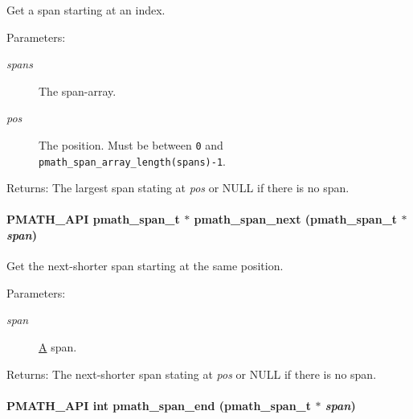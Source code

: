 Get a span starting at an index. 

\begin{Desc}
\item[Parameters:]
\begin{description}
\item[{\em spans}]The span-array. \item[{\em pos}]The position. Must be between {\tt 0} and {\tt pmath\_\-span\_\-array\_\-length(spans)-1}. \end{description}
\end{Desc}
\begin{Desc}
\item[Returns:]The largest span stating at {\em pos\/} or NULL if there is no span. \end{Desc}
\hypertarget{group__parser_g851892aa27e31d261213853112567202}{
\paragraph[{pmath\_\-span\_\-next}]{\setlength{\rightskip}{0pt plus 5cm}PMATH\_\-API {\bf pmath\_\-span\_\-t} $\ast$ pmath\_\-span\_\-next ({\bf pmath\_\-span\_\-t} $\ast$ {\em span})}\hfill}
\label{group__parser_g851892aa27e31d261213853112567202}


Get the next-shorter span starting at the same position. 

\begin{Desc}
\item[Parameters:]
\begin{description}
\item[{\em span}]\hyperlink{class_a}{A} span. \end{description}
\end{Desc}
\begin{Desc}
\item[Returns:]The next-shorter span stating at {\em pos\/} or NULL if there is no span. \end{Desc}
\hypertarget{group__parser_g67b9dc2f6484ebbe48481b2b87d76b33}{
\paragraph[{pmath\_\-span\_\-end}]{\setlength{\rightskip}{0pt plus 5cm}PMATH\_\-API int pmath\_\-span\_\-end ({\bf pmath\_\-span\_\-t} $\ast$ {\em span})}\hfill}
\label{group__parser_g67b9dc2f6484ebbe48481b2b87d76b33}


